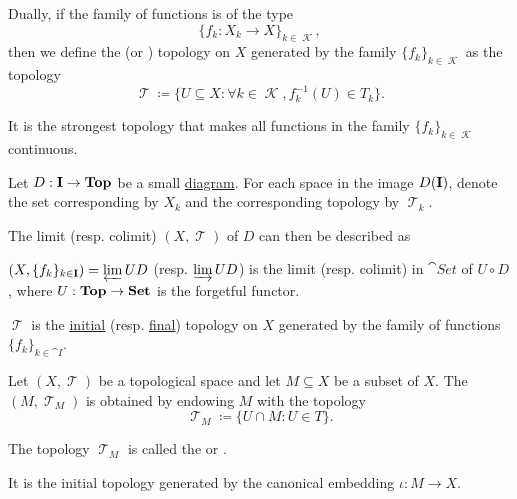 \begin{definition}\label{def:final_topology}
  Dually, if the family of functions is of the type
  \begin{equation*}
    \{ f_k: X_k \to X \}_{k \in \mscrK},
  \end{equation*}
  then we define the  (or ) topology on \( X \) generated by the family \( \{ f_k \}_{k \in \mscrK} \) as the topology
  \begin{equation*}
    \mscrT \coloneqq \{ U \subseteq X \colon \forall k \in \mscrK, f_k^{-1}(U) \in T_k \}.
  \end{equation*}

  It is the strongest topology that makes all functions in the family \( \{ f_k \}_{k \in \mscrK} \) continuous.
\end{definition}

\begin{proposition}\label{thm:initial_final_topology_limit}
  Let \( D: \operatorname{\mathbf{I}} \to \operatorname{\mathbf{Top}} \) be a small \hyperref[def:categorical_diagram]{diagram}. For each space in the image \( D(\operatorname{\mathbf{I}}) \), denote the set corresponding by \( X_k \) and the corresponding topology by \( \mscrT_k \).

  The limit (resp. colimit) \( (X, \mscrT) \) of \( D \) can then be described as
  \begin{thmenum}
    \item \( (X, \{ f_k \}_{k \in \operatorname{\mathbf{I}}}) = \varprojlim UD \) (resp. \( \varinjlim UD \)) is the limit (resp. colimit) in \( \cat{Set} \) of \( U \circ D \), where \( U: \operatorname{\mathbf{Top}} \to \operatorname{\mathbf{Set}} \) is the forgetful functor.
    \item \( \mscrT \) is the \hyperref[def:initial_topology]{initial} (resp. \hyperref[def:final_topology]{final}) topology on \( X \) generated by the family of functions \( \{ f_k \}_{k \in \cat{I}} \).
  \end{thmenum}
\end{proposition}

\begin{definition}\label{def:topological_subspace}
  Let \( (X, \mscrT) \) be a topological space and let \( M \subseteq X \) be a subset of \( X \). The  \( (M, \mscrT_M) \) is obtained by endowing \( M \) with the topology
  \begin{equation*}
    \mscrT_M \coloneqq \{ U \cap M \colon U \in T \}.
  \end{equation*}

  The topology \( \mscrT_M \) is called the  or .

  It is the initial topology generated by the canonical embedding \( \iota: M \to X \).
\end{definition}

